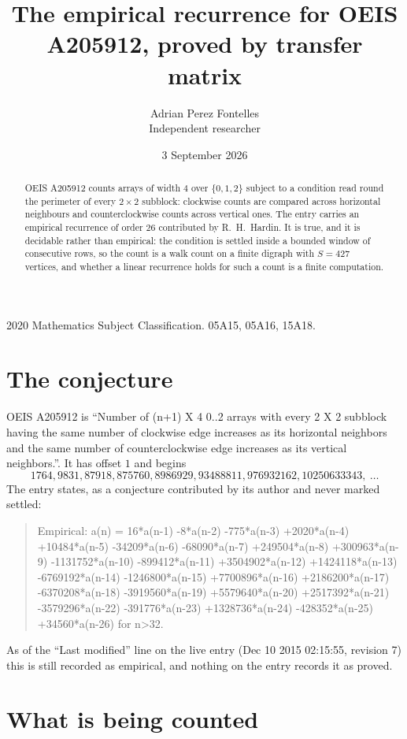 \documentclass[11pt,a4paper]{article}
\title{The empirical recurrence for OEIS A205912, proved by transfer matrix}
\author{Adrian Perez Fontelles\\ \small Independent researcher}
\date{3 September 2026}
\theoremstyle{plain}
\theoremstyle{definition}
\begin{document}
\maketitle

\begin{abstract}
OEIS A205912 counts arrays of width $4$ over $\{0,1,2\}$ subject to a condition read round the
perimeter of every $2\times2$ subblock: clockwise counts are compared across horizontal neighbours and counterclockwise counts across vertical ones. The entry carries an empirical recurrence of
order $26$ contributed by R.~H.~Hardin. It is true, and it is decidable rather than
empirical: the condition is settled inside a bounded window of consecutive rows, so the
count is a walk count on a finite digraph with $S=427$ vertices, and whether a linear
recurrence holds for such a count is a finite computation.
\end{abstract}

\noindent\small 2020 Mathematics Subject Classification. 05A15, 05A16, 15A18.\normalsize

\section{The conjecture}

OEIS A205912 is ``Number of (n+1) X 4 0..2 arrays with every 2 X 2 subblock having the same number of clockwise edge increases as its horizontal neighbors and the same number of counterclockwise edge increases as its vertical neighbors.''. It has offset $1$ and begins
\[
1764, 9831, 87918, 875760, 8986929, 93488811, 976932162, 10250633343,\ \dots
\]
The entry states, as a conjecture contributed by its author and never marked settled:
\begin{quote}
Empirical: a(n) = 16*a(n-1) -8*a(n-2) -775*a(n-3) +2020*a(n-4) +10484*a(n-5) -34209*a(n-6) -68090*a(n-7) +249504*a(n-8) +300963*a(n-9) -1131752*a(n-10) -899412*a(n-11) +3504902*a(n-12) +1424118*a(n-13) -6769192*a(n-14) -1246800*a(n-15) +7700896*a(n-16) +2186200*a(n-17) -6370208*a(n-18) -3919560*a(n-19) +5579640*a(n-20) +2517392*a(n-21) -3579296*a(n-22) -391776*a(n-23) +1328736*a(n-24) -428352*a(n-25) +34560*a(n-26) for n>32.
\end{quote}
As of the ``Last modified'' line on the live entry (Dec 10 2015 02:15:55, revision 7) this is still
recorded as empirical, and nothing on the entry records it as proved.

\section{What is being counted}
\end{document}
